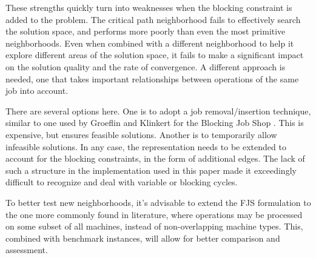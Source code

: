 \documentclass[a4paper,11pt]{article}
\begin{document}
These strengths quickly turn into weaknesses when the blocking constraint is added to the problem. The critical path neighborhood fails to effectively search the solution space, and performs more poorly than even the most primitive neighborhoods. Even when combined with a different neighborhood to help it explore different areas of the solution space, it fails to make a significant impact on the solution quality and the rate of convergence. A different approach is needed, one that takes important relationships between operations of the same job into account.

There are several options here. One is to adopt a job removal/insertion technique, similar to one used by Groeflin and Klinkert for the Blocking Job Shop \cite{lsn-bjs}. This is expensive, but ensures feasible solutions. Another is to temporarily allow infeasible solutions. In any case, the representation needs to be extended to account for the blocking constraints, in the form of additional edges. The lack of such a structure in the implementation used in this paper made it exceedingly difficult to recognize and deal with variable or blocking cycles.

To better test new neighborhoods, it's advisable to extend the FJS formulation to the one more commonly found in literature, where operations may be processed on some subset of all machines, instead of non-overlapping machine types. This, combined with benchmark instances, will allow for better comparison and assessment.

\printbibliography[heading=bibintoc]
\end{document}

